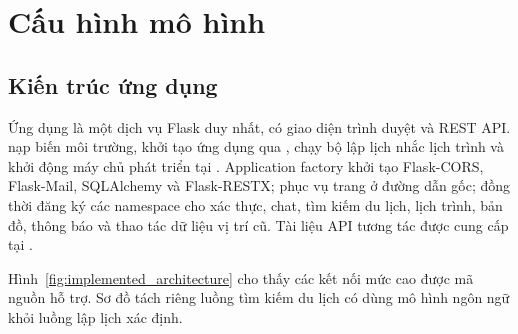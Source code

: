 \chapter{Cấu hình mô hình}
\label{chap:model_configuration}

\section{Kiến trúc ứng dụng}

Ứng dụng là một dịch vụ Flask duy nhất, có giao diện trình duyệt và REST API.  nạp biến môi trường, khởi tạo ứng dụng qua , chạy bộ lập lịch nhắc lịch trình và khởi động máy chủ phát triển tại . Application factory khởi tạo Flask-CORS, Flask-Mail, SQLAlchemy và Flask-RESTX; phục vụ trang  ở đường dẫn gốc; đồng thời đăng ký các namespace cho xác thực, chat, tìm kiếm du lịch, lịch trình, bản đồ, thông báo và thao tác dữ liệu vị trí cũ. Tài liệu API tương tác được cung cấp tại .

Hình~\ref{fig:implemented_architecture} cho thấy các kết nối mức cao được mã nguồn hỗ trợ. Sơ đồ tách riêng luồng tìm kiếm du lịch có dùng mô hình ngôn ngữ khỏi luồng lập lịch xác định.

